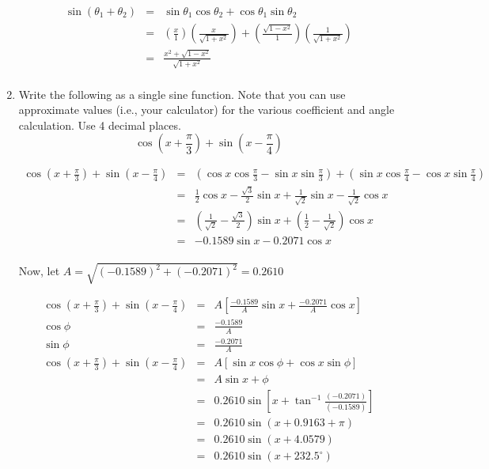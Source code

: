 \documentclass[letterpaper,12pt,fleqn]{article}
\renewcommand{\o}{\theta}
\newcommand{\p}{\phi}
\begin{document}
\begin{enumerate}
  \begin{eqnarray*}
    \sin(\o_1+\o_2) &=& \sin\o_1\cos\o_2+\cos\o_1\sin\o_2 \\
    &=& \left(\frac{x}{1}\right)\left(\frac{x}{\sqrt{1+x^2}}\right)+
    \left(\frac{\sqrt{1-x^2}}{1}\right)\left(\frac{1}{\sqrt{1+x^2}}\right) \\
    &=& \frac{x^2+\sqrt{1-x^2}}{\sqrt{1+x^2}} \\
  \end{eqnarray*}

\item Write the following as a single sine function. Note that you can use
  approximate values (i.e., your calculator) for the various coefficient and
  angle calculation. Use 4 decimal places.
  \[\cos\left(x+\frac{\pi}{3}\right)+\sin\left(x-\frac{\pi}{4}\right)\]

  \begin{eqnarray*}
    \cos\left(x+\frac{\pi}{3}\right)+\sin\left(x-\frac{\pi}{4}\right) &=&
    (\cos{x}\cos{\frac{\pi}{3}}-\sin{x}\sin{\frac{\pi}{3}})+
    (\sin{x}\cos{\frac{\pi}{4}}-\cos{x}\sin{\frac{\pi}{4}}) \\
    &=& \frac{1}{2}\cos{x}-\frac{\sqrt{3}}{2}\sin{x}+
    \frac{1}{\sqrt{2}}\sin{x}-\frac{1}{\sqrt{2}}\cos{x} \\
    &=& \left(\frac{1}{\sqrt{2}}-\frac{\sqrt{3}}{2}\right)\sin{x}+
    \left(\frac{1}{2}-\frac{1}{\sqrt{2}}\right)\cos{x} \\
    &=& -0.1589\sin{x}-0.2071\cos{x} \\
  \end{eqnarray*}

  Now, let $A=\sqrt{(-0.1589)^2+(-0.2071)^2}=0.2610$

  \begin{eqnarray*}
    \cos\left(x+\frac{\pi}{3}\right)+\sin\left(x-\frac{\pi}{4}\right) &=&
    A\left[\frac{-0.1589}{A}\sin{x}+\frac{-0.2071}{A}\cos{x}\right] \\
    \cos\p &=& \frac{-0.1589}{A} \\
    \sin\p &=& \frac{-0.2071}{A} \\
    \cos\left(x+\frac{\pi}{3}\right)+\sin\left(x-\frac{\pi}{4}\right) &=&
    A\left[\sin{x}\cos\p+\cos{x}\sin\p\right] \\
    &=& A\sin{x+\p} \\
    &=& 0.2610\sin\left[x+\tan^{-1}\frac{(-0.2071)}{(-0.1589)}\right] \\
    &=& 0.2610\sin(x+0.9163+\pi) \\
    &=& 0.2610\sin(x+4.0579) \\
    &=& 0.2610\sin(x+232.5^{\circ}) \\
  \end{eqnarray*}


\end{enumerate}
\end{document}
